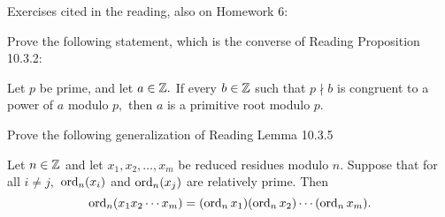 \documentclass{ximera}
\begin{document}
Exercises cited in the reading, also on Homework 6:



\begin{br}
    Prove the following statement, which is the converse of Reading Proposition 10.3.2:

    Let $p$ be prime, and let $a\in\mathbb Z.$ If every $b\in\mathbb Z$ such that $p\nmid b$ is congruent to a power of $a$ modulo $p,$ then ${a}$ is a primitive root modulo $p$.
    
\end{br}

\begin{br}
    Prove the following generalization of Reading Lemma 10.3.5
    
    
    \begin{lemma}\label{lem-order-mult}
        Let $n\in\mathbb Z$ and let $x_1,x_2,\dots,x_m$ be reduced residues modulo $n$.  Suppose that for all $i\neq j,$ $\operatorname{ord}_n(x_i)$ and $\operatorname{ord}_n(x_j)$ are relatively prime. Then \[\operatorname{ord}_n(x_1 x_2\cdots x_m)=(\operatorname{ord}_n x_1)(\operatorname{ord}_n x_2)\cdots (\operatorname{ord}_n x_m).\]
    \end{lemma}
\end{br}
\end{document}

